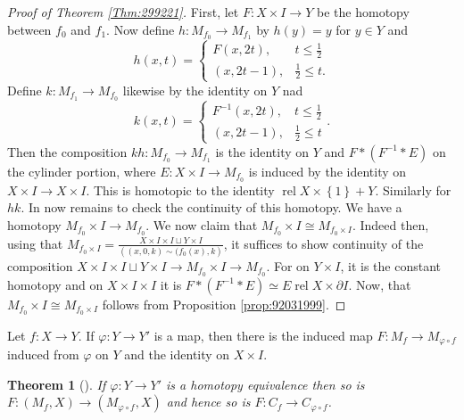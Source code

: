\documentclass[reqno]{amsart}
\newtheorem{theorem}{Theorem}[section]
\theoremstyle{definition}
\theoremstyle{remark}
\DeclareMathOperator{\rel}{rel}
\begin{document}
\begin{proof}[Proof of Theorem \ref{Thm:299221}]
    First, let $F \colon X \times I \to Y$ be the homotopy
    between $f_0$ and $f_1$. Now define $h \colon
    M_{f_0} \to M_{f_1}$ by $h(y) = y$ for
    $y \in Y$ and
    \[
    h\left( x,t \right) = 
    \begin{cases}
        F\left( x,2t \right) ,& t\le \frac{1}{2}\\
        (x, 2t-1),& \frac{1}{2} \le t.
    \end{cases}
    \] 
    Define
    $k \colon M_{f_1} \to M_{f_0}$ likewise by
    the identity on $Y$ nad
    \[
    k\left( x,t \right) =
    \begin{cases}
        F^{-1}\left( x,2t \right) ,& t\le \frac{1}{2}\\
        (x,2t-1),& \frac{1}{2}\le t
    \end{cases}.
    \] 
    Then the composition
    $kh \colon M_{f_0} \to M_{f_1}$ is the identity
    on $Y$ and 
    $F * \left( F^{-1} * E \right) $ on
    the cylinder portion, where $E \colon X \times I \to 
    M_{f_0}$ is induced by the identity on
    $X \times I \to X \times I$.
    This is homotopic to the identity 
    $\rel X \times \left\{ 1 \right\} + Y$.
    Similarly for $hk$.
    In now remains to check the continuity of this homotopy.
    We have a homotopy $M_{f_0} \times I \to 
    M_{f_0}$. We now claim that
    $M_{f_0} \times I \cong M_{f_0 \times I}$. Indeed
    then, using that
    $M_{f_0 \times I} = 
    \frac{X \times I \times I \sqcup Y \times I}{
    \left( (x,0,k) \sim (f_0(x),k \right) }$, it suffices
    to show continuity of the composition
    $X \times I \times I \sqcup Y \times I
    \to M_{f_0} \times I \to M_{f_0}$. 
    For on $Y \times I$, it is the constant homotopy and
    on $X \times I \times I$ it is
    $F * \left( F^{-1} * E \right) \simeq E
    \rel X \times \partial I$. 
    Now, that $M _{f_0} \times I
    \cong M_{f_0 \times I}$ follows from
    Proposition \ref{prop:92031999}.

\end{proof}

Let $f \colon X \to Y$. If $\varphi  \colon Y \to Y'$ is a map,
then there is the induced map
$F \colon M_{f} \to M_{\varphi \circ f}$ induced from
$\varphi $ on $Y$ and the identity on $X \times I$.

\begin{theorem}[]
    If $\varphi  \colon Y \to Y'$ is a homotopy equivalence
    then so is 
    $F \colon \left( M_f , X \right) \to 
    \left( M_{\varphi  \circ f}, X \right) $ and hence
    so is $F \colon C_f \to C_{\varphi  \circ f}$.
\end{theorem}
\end{document}
